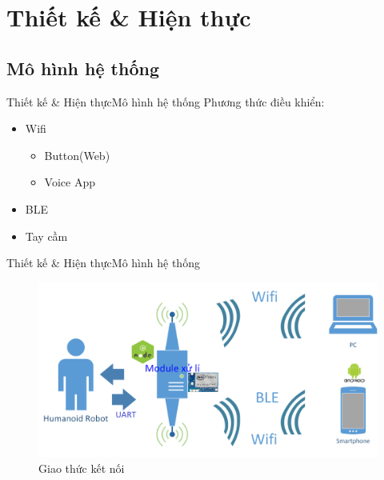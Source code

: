 \documentclass[compress, blue, 13pt,hyperref={pdfpagemode=FullScreen}]{beamer}
\begin{document}
\section{Thiết kế \& Hiện thực}
\subsection{Mô hình hệ thống}
\begin{frame}{Thiết kế \& Hiện thực}{Mô hình hệ thống}
Phương thức điều khiển:
\begin{itemize}
\item Wifi
\begin{itemize}
\item Button(Web)
\item Voice App
\end{itemize}
\item BLE
\item Tay cầm
\end{itemize}
\end{frame}
\begin{frame}{Thiết kế \& Hiện thực}{Mô hình hệ thống}
\begin{figure}[hbtp]
\centering
\includegraphics[scale=0.2]{images/protocol.png}
\caption{Giao thức kết nối}
\end{figure}
\end{frame}
\end{document}
